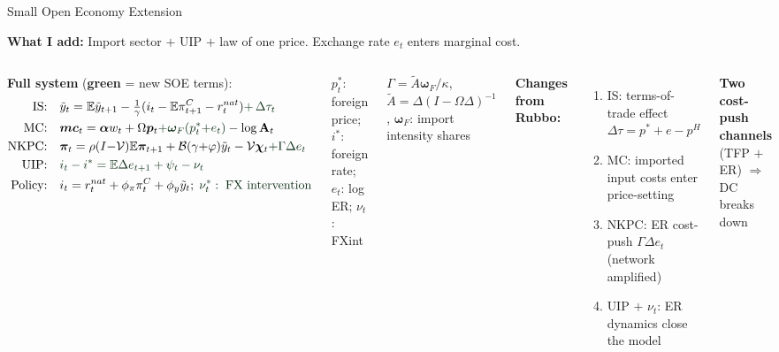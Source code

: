 \documentclass[aspectratio=169, 10pt]{beamer}
\newcommand{\bpi}{\bm{\pi}}
\newcommand{\ty}{\tilde{y}}
\newcommand{\tA}{\tilde{A}}
\newcommand{\bom}{\bm{\omega}_F}
\begin{document}
\begin{frame}{Small Open Economy Extension}

{\footnotesize \textbf{What I add:} Import sector $+$ UIP $+$ law of one price. Exchange rate $e_t$ enters marginal cost.}

\vspace{1pt}
\begin{columns}[t]

{\footnotesize \textbf{Full system} (\textcolor{customgreen}{\textbf{green}} = new SOE terms):}
\vspace{-4pt}
{\scriptsize\begin{align*}
\text{IS:} &\quad \ty_t = \mathbb{E}\ty_{t+1} - \tfrac{1}{\gamma}(i_t - \mathbb{E}\pi^C_{t+1} - r^{nat}_t) \textcolor{customgreen}{+\,\Delta\tau_t} \\[0pt]
\text{MC:} &\quad \bm{mc}_t = \bm{\alpha}w_t + \Omega\bm{p}_t \textcolor{customgreen}{+ \bom(p^*_t{+}e_t)} - \log\mathbf{A}_t \\[0pt]
\text{NKPC:} &\quad \bpi_t = \rho(I{-}\mathcal{V})\mathbb{E}\bpi_{t+1} + \mathcal{B}(\gamma{+}\varphi)\ty_t - \mathcal{V}\bm{\chi}_t \textcolor{customgreen}{+ \Gamma\Delta e_t} \\[0pt]
\text{UIP:} &\quad \textcolor{customgreen}{i_t - i^* = \mathbb{E}\Delta e_{t+1} + \psi_t - \nu_t} \\[0pt]
\text{Policy:} &\quad i_t = r^{nat}_t + \phi_\pi\pi^C_t + \phi_y\ty_t;\;\textcolor{customgreen}{\nu_t^*:\;\text{FX intervention}}
\end{align*}}
\vspace{-7pt}
{\scriptsize $p^*_t$: foreign price;\; $i^*$: foreign rate;\; $e_t$: log ER;\; $\nu_t$: FXint

\vspace{5pt}

$\Gamma{=}\tA\bom/\kappa$,\; $\tA{=}\Delta(I{-}\Omega\Delta)^{-1}$,\; $\bom$: import intensity shares}

\vspace{0pt}
{\footnotesize \textbf{Changes from Rubbo:}
\begin{enumerate}\setlength{\itemsep}{0pt}\setlength{\topsep}{1pt}
  \item IS: terms-of-trade effect $\Delta\tau = p^*{+}e - p^H$
  \item MC: imported input costs enter price-setting
  \item NKPC: ER cost-push $\Gamma\Delta e_t$ (network amplified)
  \item UIP $+$ $\nu_t$: ER dynamics close the model
\end{enumerate}
\textbf{Two cost-push channels} (TFP $+$ ER) $\Rightarrow$ DC breaks down}


\end{columns}
\end{frame}
\end{document}
